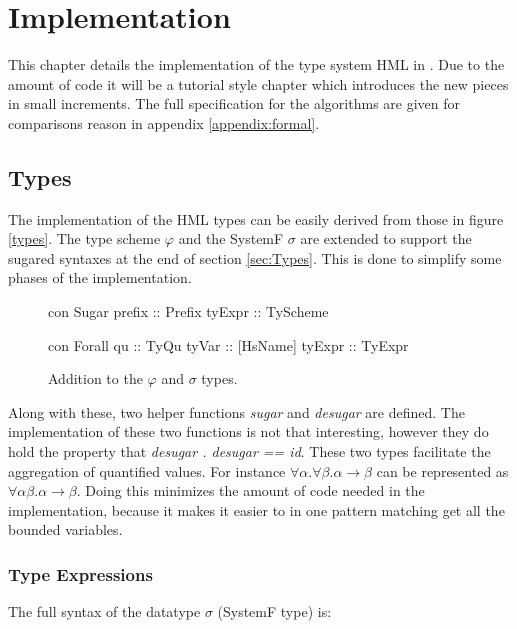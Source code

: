 \chapter{Implementation}
\label{Implementation}
This chapter details the implementation of the type system HML in \rcore. Due to the amount of code it will be a tutorial style chapter which introduces the new pieces in small increments. The full specification for the algorithms are given for comparisons reason in appendix \ref{appendix:formal}.
\section{Types}
The implementation of the HML types can be easily derived from those in figure \ref{types}. The type scheme $\varphi$ and the SystemF $\sigma$ are extended to support the sugared syntaxes at the end of section \ref{sec:Types}. This is done to simplify some phases of the implementation.

\begin{figure}[H]
\begin{minipage}[t]{0.4\linewidth}
\begin{code}
  con Sugar
     prefix  :: Prefix
     tyExpr  :: TyScheme
\end{code}
\end{minipage}
\begin{minipage}[t]{0.6\linewidth}
\begin{code}
  con Forall
    qu        :: TyQu
    tyVar     :: [HsName]
    tyExpr    :: TyExpr 
\end{code} 
\end{minipage}
\caption{Addition to the $\varphi$ and $\sigma$ types.}
\label{abs:fig:types}
\end{figure}

Along with these, two helper functions \emph{sugar} and \emph{desugar} are defined. The implementation of these two functions is not that interesting, however they do hold the property that \emph{desugar . desugar == id}. These two types facilitate the aggregation of quantified values. For instance $\forall \alpha . \forall \beta. \alpha \rightarrow \beta$ can be represented as $\forall \alpha \beta . \alpha \rightarrow \beta$. Doing this minimizes the amount of code needed in the implementation, because it makes it easier to in one pattern matching get all the bounded variables.
\subsection{Type Expressions}
The full syntax of the datatype $\sigma$ (SystemF type) is:

